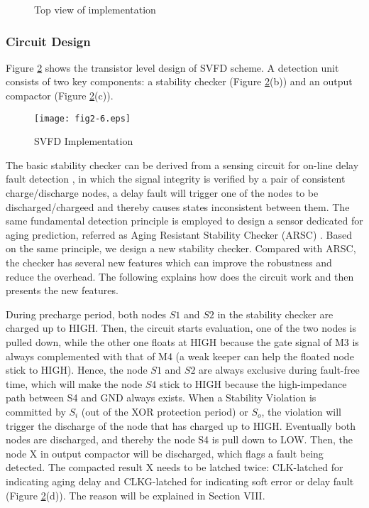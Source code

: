 \begin{figure}[t]
\centering 
{} 

  \caption{Top view of implementation}
\label{imple}
\end{figure}

\subsubsection{Circuit Design}
Figure \ref{circuit} shows the transistor level design of SVFD scheme. A detection unit consists of two key components: a stability checker (Figure \ref{circuit}(b)) and an output compactor (Figure \ref{circuit}(c)).

\begin{figure}[t]
\centering
\texttt{[image: fig2-6.eps]}
\vspace{-0.5em}  
\caption{SVFD Implementation} \label{circuit}
\end{figure}

The basic stability checker can be derived from a sensing circuit for on-line delay fault detection \cite{sensing_96}, in which the signal integrity is verified by a pair of consistent charge/discharge nodes, a delay fault will trigger one of the nodes to be discharged/chargeed and thereby causes states inconsistent between them. The same fundamental detection principle is employed to design a sensor dedicated for aging prediction, referred as Aging Resistant Stability Checker (ARSC) \cite{failure_prediction_07}. Based on the same principle, we design a new stability checker. Compared with ARSC, the checker has several new features which can improve the robustness and reduce the overhead. The following explains how does the circuit work and then presents the new features.

During precharge period, both nodes $S1$ and $S2$ in the stability checker are charged up to HIGH. Then, the circuit starts evaluation, one of the two nodes is pulled down, while the other one floats at HIGH because the gate signal of M3 is always complemented with that of M4 (a weak keeper can help the floated node stick to HIGH). Hence, the node $S1$ and $S2$ are always exclusive during fault-free time, which will make the node $S4$ stick to HIGH because the high-impedance path between S4 and GND always exists. When a Stability Violation is committed by $S_i$ (out of the XOR protection period) or $S_o$, the violation will trigger the discharge of the node that has charged up to HIGH. Eventually both nodes are discharged, and thereby the node S4 is pull down to LOW. Then, the node X in output compactor will be discharged, which flags a fault being detected. The compacted result X needs to be latched twice: CLK-latched for indicating aging delay and CLKG-latched for indicating soft error or delay fault (Figure \ref{circuit}(d)). The reason will be explained in Section VIII.

